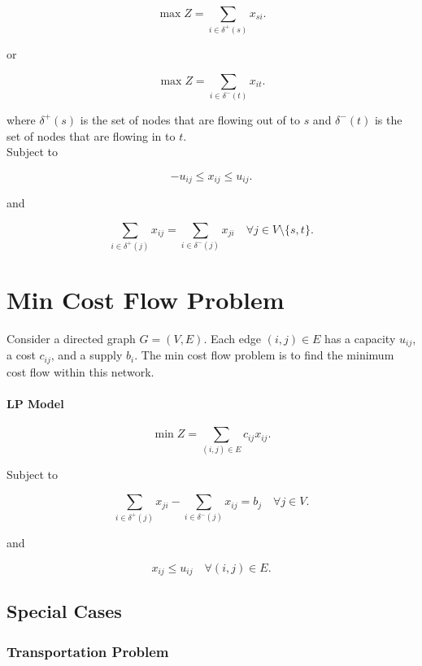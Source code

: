 \documentclass{report}
\begin{document}
\[
	\max Z = \sum_{i\in\delta^+(s)} x_{si}
	.\]

or

\[
	\max Z = \sum_{i\in\delta^-(t)} x_{it}
	.\]

where $\delta^+(s)$ is the set of nodes that are flowing out of to $s$ and $\delta^-(t)$ is the set of nodes that are flowing in to $t$.\\

Subject to

\[
	-u_{ij} \leq x_{ij} \leq u_{ij}
	.\]

and

\[
	\sum_{i\in\delta^+(j)} x_{ij} = \sum_{i\in\delta^-(j)} x_{ji} \quad \forall j\in V\setminus\{s,t\}
	.\]

\section{Min Cost Flow Problem}

Consider a directed graph $G=(V,E)$. Each edge $(i,j)\in E$ has a capacity $u_{ij}$, a cost $c_{ij}$, and a supply $b_i$. The min cost flow problem is to find the minimum cost flow within this network.

\paragraph{LP Model}

\[
	\min Z = \sum_{(i,j)\in E} c_{ij}x_{ij}
	.\]

Subject to

\[
	\sum_{i\in\delta^+(j)} x_{ji} - \sum_{i\in\delta^-(j)} x_{ij} = b_j \quad \forall j\in V
	.\]

and

\[
	x_{ij} \leq u_{ij} \quad \forall (i,j)\in E
	.\]



\subsection{Special Cases}

\subsubsection{Transportation Problem}
\end{document}
